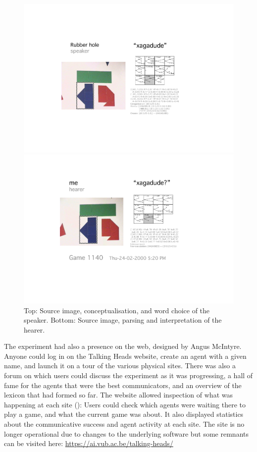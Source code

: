 \begin{figure}[htbp]
 \centerline{\includegraphics[width=.80\textwidth]{chap8/figures/xagadu-speaker.pdf}}
\centerline{\includegraphics[width=.80\textwidth]{chap8/figures/xagadu-hearer.pdf}}
\caption{\label{fig:interaction}Top: Source image, conceptualisation, and word choice of the speaker. Bottom: Source image, parsing and interpretation 
of the hearer.}
\end{figure}

The experiment had also a presence on the web, designed by Angus McIntyre. Anyone could log in on the 
Talking Heads website, create an agent with 
a given name, and launch it on a tour of the various physical sites. There was also a forum on which users could discuss
the experiment as it was progressing, a hall of fame for the agents that were the best communicators, and 
an overview of the lexicon 
that had formed so far. The website allowed inspection of what was happening at each site (): 
Users could check which agents were waiting there to play a game, and what the current 
game was about. It also displayed statistics about the 
communicative success and agent activity at each site. The site is no longer operational due to 
changes to the underlying software but some remnants can be visited here: \url{https://ai.vub.ac.be/talking-heads/}

